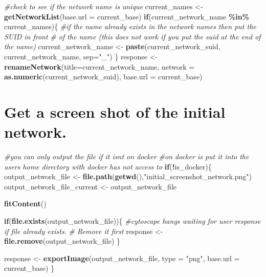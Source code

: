 \documentclass[
]{book}
\newenvironment{Shaded}{\begin{snugshade}}{\end{snugshade}}
\newcommand{\AttributeTok}[1]{\textcolor[rgb]{0.13,0.29,0.53}{#1}}
\newcommand{\CommentTok}[1]{\textcolor[rgb]{0.56,0.35,0.01}{\textit{#1}}}
\newcommand{\ControlFlowTok}[1]{\textcolor[rgb]{0.13,0.29,0.53}{\textbf{#1}}}
\newcommand{\FunctionTok}[1]{\textcolor[rgb]{0.13,0.29,0.53}{\textbf{#1}}}
\newcommand{\NormalTok}[1]{#1}
\newcommand{\OtherTok}[1]{\textcolor[rgb]{0.56,0.35,0.01}{#1}}
\newcommand{\SpecialCharTok}[1]{\textcolor[rgb]{0.81,0.36,0.00}{\textbf{#1}}}
\newcommand{\StringTok}[1]{\textcolor[rgb]{0.31,0.60,0.02}{#1}}
\begin{document}
\begin{Shaded}
\begin{Highlighting}[]
\CommentTok{\#check to see if the network name is unique}
\NormalTok{current\_names }\OtherTok{\textless{}{-}} \FunctionTok{getNetworkList}\NormalTok{(}\AttributeTok{base.url =}\NormalTok{ current\_base)}
\ControlFlowTok{if}\NormalTok{(current\_network\_name }\SpecialCharTok{\%in\%}\NormalTok{ current\_names)\{}
  \CommentTok{\#if the name already exists in the network names then put the SUID in front}
  \CommentTok{\# of the name (this does not work if you put the suid at the end of the name)}
\NormalTok{  current\_network\_name }\OtherTok{\textless{}{-}} \FunctionTok{paste}\NormalTok{(current\_network\_suid,}
\NormalTok{                                current\_network\_name,  }\AttributeTok{sep=}\StringTok{"\_"}\NormalTok{)}
\NormalTok{\}}
\NormalTok{response }\OtherTok{\textless{}{-}} \FunctionTok{renameNetwork}\NormalTok{(}\AttributeTok{title=}\NormalTok{current\_network\_name, }
                       \AttributeTok{network =} \FunctionTok{as.numeric}\NormalTok{(current\_network\_suid),}
                       \AttributeTok{base.url =}\NormalTok{ current\_base)}
\end{Highlighting}
\end{Shaded}

\hypertarget{get-a-screen-shot-of-the-initial-network.}{%
\section{Get a screen shot of the initial network.}\label{get-a-screen-shot-of-the-initial-network.}}

\begin{Shaded}
\begin{Highlighting}[]
\CommentTok{\#you can only output the file if it isn\textquotesingle{}t on docker}
\CommentTok{\#on docker is put it into the user\textquotesingle{}s home directory with docker has not access to}
\ControlFlowTok{if}\NormalTok{(}\SpecialCharTok{!}\NormalTok{is\_docker)\{}
\NormalTok{  output\_network\_file }\OtherTok{\textless{}{-}} \FunctionTok{file.path}\NormalTok{(}\FunctionTok{getwd}\NormalTok{(),}\StringTok{"initial\_screenshot\_network.png"}\NormalTok{)}
\NormalTok{  output\_network\_file\_current }\OtherTok{\textless{}{-}}\NormalTok{ output\_network\_file}

  \FunctionTok{fitContent}\NormalTok{()}

  \ControlFlowTok{if}\NormalTok{(}\FunctionTok{file.exists}\NormalTok{(output\_network\_file))\{}
    \CommentTok{\#cytoscape hangs waiting for user response if file already exists.  }
    \CommentTok{\# Remove it first}
\NormalTok{    response }\OtherTok{\textless{}{-}} \FunctionTok{file.remove}\NormalTok{(output\_network\_file)}
\NormalTok{  \} }

\NormalTok{  response }\OtherTok{\textless{}{-}} \FunctionTok{exportImage}\NormalTok{(output\_network\_file, }\AttributeTok{type =} \StringTok{"png"}\NormalTok{,}
                          \AttributeTok{base.url =}\NormalTok{ current\_base)}
\NormalTok{\}}
\end{Highlighting}
\end{Shaded}
\end{document}
